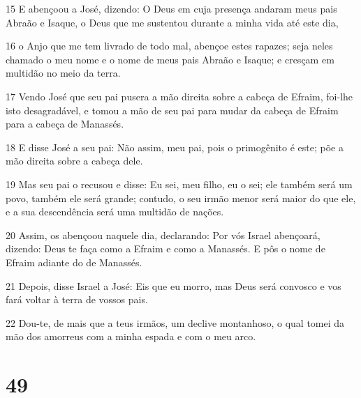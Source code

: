 \par 15 E abençoou a José, dizendo: O Deus em cuja presença andaram meus pais Abraão e Isaque, o Deus que me sustentou durante a minha vida até este dia,
\par 16 o Anjo que me tem livrado de todo mal, abençoe estes rapazes; seja neles chamado o meu nome e o nome de meus pais Abraão e Isaque; e cresçam em multidão no meio da terra.
\par 17 Vendo José que seu pai pusera a mão direita sobre a cabeça de Efraim, foi-lhe isto desagradável, e tomou a mão de seu pai para mudar da cabeça de Efraim para a cabeça de Manassés.
\par 18 E disse José a seu pai: Não assim, meu pai, pois o primogênito é este; põe a mão direita sobre a cabeça dele.
\par 19 Mas seu pai o recusou e disse: Eu sei, meu filho, eu o sei; ele também será um povo, também ele será grande; contudo, o seu irmão menor será maior do que ele, e a sua descendência será uma multidão de nações.
\par 20 Assim, os abençoou naquele dia, declarando: Por vós Israel abençoará, dizendo: Deus te faça como a Efraim e como a Manassés. E pôs o nome de Efraim adiante do de Manassés.
\par 21 Depois, disse Israel a José: Eis que eu morro, mas Deus será convosco e vos fará voltar à terra de vossos pais.
\par 22 Dou-te, de mais que a teus irmãos, um declive montanhoso, o qual tomei da mão dos amorreus com a minha espada e com o meu arco.

\chapter{49}


